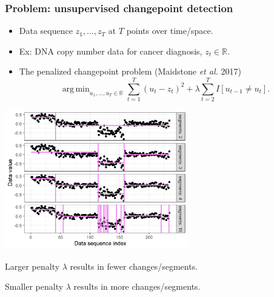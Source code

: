 \documentclass[t]{beamer}
\DeclareMathOperator*{\argmin}{arg\,min}
\begin{document}
\begin{frame}
  \frametitle{Problem: unsupervised changepoint detection}
  \begin{itemize}
  \item Data sequence $z_1,\dots,z_T$ at $T$ points over time/space.
  \item Ex: DNA copy number data for cancer diagnosis, $z_t\in\mathbb R$.
  \item The penalized changepoint problem (Maidstone \emph{et al.} 2017)
$$\argmin_{u_1,\dots,u_T\in\mathbb R} \sum_{t=1}^T (u_t - z_t)^2 + \lambda\sum_{t=2}^T I[u_{t-1} \neq u_t].$$
  \end{itemize}

  \parbox{0.6\textwidth}{
\includegraphics[width=0.6\textwidth]{figure-fn-not-monotonic-no-labels}
}
\parbox{0.3\textwidth}{
  Larger penalty $\lambda$ results in fewer changes/segments.

  \vskip 0.5in

  Smaller penalty $\lambda$ results in more changes/segments.
}

\end{frame}
\end{document}
